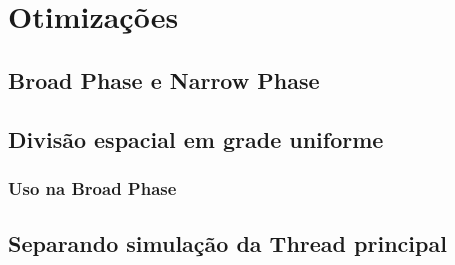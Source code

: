 \chapter{Otimizações}

\section{Broad Phase e Narrow Phase}

\section{Divisão espacial em grade uniforme}

\subsection{Uso na Broad Phase}

\section{Separando simulação da Thread principal}
